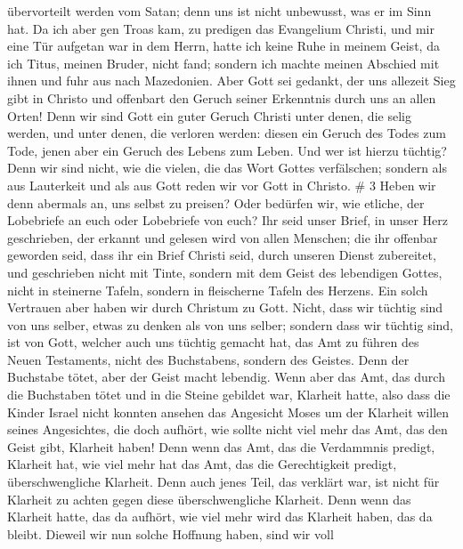 übervorteilt werden vom Satan; denn uns ist nicht unbewusst, was er im
Sinn hat.  Da ich aber gen Troas kam, zu predigen das
Evangelium Christi, und mir eine Tür aufgetan war in dem Herrn,
 hatte ich keine Ruhe in meinem Geist, da ich Titus, meinen
Bruder, nicht fand; sondern ich machte meinen Abschied mit ihnen und
fuhr aus nach Mazedonien.  Aber Gott sei gedankt, der uns
allezeit Sieg gibt in Christo und offenbart den Geruch seiner Erkenntnis
durch uns an allen Orten!  Denn wir sind Gott ein guter
Geruch Christi unter denen, die selig werden, und unter denen, die
verloren werden:  diesen ein Geruch des Todes zum Tode,
jenen aber ein Geruch des Lebens zum Leben. Und wer ist hierzu tüchtig?
 Denn wir sind nicht, wie die vielen, die das Wort Gottes
verfälschen; sondern als aus Lauterkeit und als aus Gott reden wir vor
Gott in Christo. \# 3  Heben wir denn abermals an, uns
selbst zu preisen? Oder bedürfen wir, wie etliche, der Lobebriefe an
euch oder Lobebriefe von euch?  Ihr seid unser Brief, in
unser Herz geschrieben, der erkannt und gelesen wird von allen Menschen;
 die ihr offenbar geworden seid, dass ihr ein Brief Christi
seid, durch unseren Dienst zubereitet, und geschrieben nicht mit Tinte,
sondern mit dem Geist des lebendigen Gottes, nicht in steinerne Tafeln,
sondern in fleischerne Tafeln des Herzens.  Ein solch
Vertrauen aber haben wir durch Christum zu Gott.  Nicht,
dass wir tüchtig sind von uns selber, etwas zu denken als von uns
selber; sondern dass wir tüchtig sind, ist von Gott, 
welcher auch uns tüchtig gemacht hat, das Amt zu führen des Neuen
Testaments, nicht des Buchstabens, sondern des Geistes. Denn der
Buchstabe tötet, aber der Geist macht lebendig.  Wenn aber
das Amt, das durch die Buchstaben tötet und in die Steine gebildet war,
Klarheit hatte, also dass die Kinder Israel nicht konnten ansehen das
Angesicht Moses um der Klarheit willen seines Angesichtes, die doch
aufhört,  wie sollte nicht viel mehr das Amt, das den Geist
gibt, Klarheit haben!  Denn wenn das Amt, das die Verdammnis
predigt, Klarheit hat, wie viel mehr hat das Amt, das die Gerechtigkeit
predigt, überschwengliche Klarheit.  Denn auch jenes Teil,
das verklärt war, ist nicht für Klarheit zu achten gegen diese
überschwengliche Klarheit.  Denn wenn das Klarheit hatte,
das da aufhört, wie viel mehr wird das Klarheit haben, das da bleibt.
 Dieweil wir nun solche Hoffnung haben, sind wir voll

